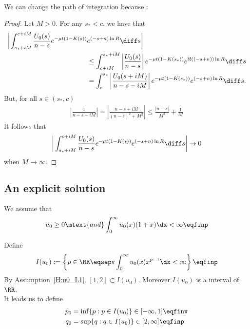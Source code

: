 \begin{remark}
    We can change the path of integration because : 
\end{remark}
\begin{proof}
    Let $M > 0$. For any $s_* < c$, we have that 
    \begin{align*}
        \bigg| \int_{s_*+iM}^{c+iM} \frac{U_0(s)}{n-s} e^{-\mu t(1 - K(s))} &e^{(-s+n)\ln R} \diff s \bigg|
        \\
        &\leq 
     \int_{c+iM}^{s_*+iM} \left|\frac{U_0(s)}{n-s}\right| e^{-\mu t(1 - K(s_*))} e^{\Re((-s+n))\ln R} \diff s \\
     &= 
     \int_{c}^{s_*} \left|\frac{U_0(s+iM)}{n-s-iM}\right| e^{-\mu t(1 - K(s_*))} e^{(-s+n)\ln R} \diff s.
    \end{align*}
But, for all $s \in (s_*, c)$
\begin{align*}
    \left|\frac{1}{n-s-iM}\right| = \left|\frac{n-s + iM}{(n-s)^2+M^2}\right| \leq \frac{|n-s|}{M^2} + \frac1M
\end{align*}
It follows that $$ \bigg| \int_{s_*+iM}^{c+iM} \frac{U_0(s)}{n-s} e^{-\mu t(1 - K(s))} e^{(-s+n)\ln R} \diff s \bigg| \to 0$$ when $M \to \infty$.
\end{proof}

\subsection{An explicit solution}
\label{s:explicit}

We assume that     \begin{equation}
    u_0 \geq 0 \mtext{and} \int_0^\infty u_0(x) (1+x) \dx < \infty
    \eqfinp
    \label{H:u0_L1}
\end{equation}

Define 
\begin{equation}
    I(u_0) := \left\{ p \in \RR \eqsepv \int_0^\infty u_0(x) x^{p-1} \dx < \infty \right\}
    \eqfinp
\end{equation}
By Assumption~\eqref{H:u0_L1}, $[1, 2] \subset I(u_0)$. Moreover $I(u_0)$ is a interval of $\RR$.\\
It leads us to define
\begin{subequations}
\begin{align*}
    p_0 &= \inf \{p : p \in I(u_0) \} \in [-\infty, 1] \eqfinv\\
    q_0 &= \sup \{q : q \in I(u_0) \} \in [2, \infty] \eqfinp
\end{align*}    
\end{subequations}

